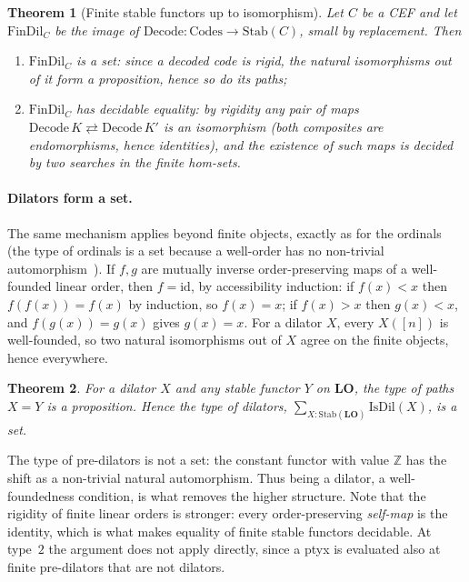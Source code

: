 \documentclass[11pt]{article}
\newtheorem{theorem}{Theorem}[section]
\theoremstyle{definition}
\theoremstyle{remark}
\newcommand{\Stab}{\mathrm{Stab}}
\newcommand{\LO}{\mathbf{LO}}
\begin{document}
\begin{theorem}[Finite stable functors up to isomorphism]
Let $C$ be a CEF and let $\mathrm{FinDil}_C$ be the image of
$\mathrm{Decode}:\mathrm{Codes}\to\Stab(C)$, small by replacement. Then
\begin{enumerate}
\item $\mathrm{FinDil}_C$ is a set: since a decoded code is rigid, the
  natural isomorphisms out of it form a proposition, hence so do its
  paths;
\item $\mathrm{FinDil}_C$ has decidable equality: by rigidity \emph{any}
  pair of maps $\mathrm{Decode}\,K\rightleftarrows\mathrm{Decode}\,K'$ is
  an isomorphism (both composites are endomorphisms, hence identities),
  and the existence of such maps is decided by two searches in the finite
  hom-sets.
\end{enumerate}
\end{theorem}

\paragraph{Dilators form a set.} The same mechanism applies beyond finite
objects, exactly as for the ordinals (the type of ordinals is a set because
a well-order has no non-trivial automorphism~\cite[\S10.3]{HoTT}). If $f,g$
are mutually inverse order-preserving maps of a well-founded linear order,
then $f=\mathrm{id}$, by accessibility induction: if $f(x)<x$ then
$f(f(x))=f(x)$ by induction, so $f(x)=x$; if $f(x)>x$ then $g(x)<x$, and
$f(g(x))=g(x)$ gives $g(x)=x$. For a dilator $X$, every $X([n])$ is
well-founded, so two natural isomorphisms out of $X$ agree on the finite
objects, hence everywhere.

\begin{theorem}
For a dilator $X$ and any stable functor $Y$ on $\LO$, the type of paths
$X=Y$ is a proposition. Hence the type of dilators,
$\sum_{X:\Stab(\LO)}\mathrm{IsDil}(X)$, is a set.
\end{theorem}

The type of pre-dilators is not a set: the constant functor with value
$\mathbb{Z}$ has the shift as a non-trivial natural automorphism. Thus
being a dilator, a well-foundedness condition, is what removes the higher
structure. Note that the rigidity of finite linear orders is stronger: every
order-preserving \emph{self-map} is the identity, which is what makes
equality of finite stable functors decidable. At type~$2$ the argument does
not apply directly, since a ptyx is evaluated also at finite pre-dilators
that are not dilators.
\end{document}
